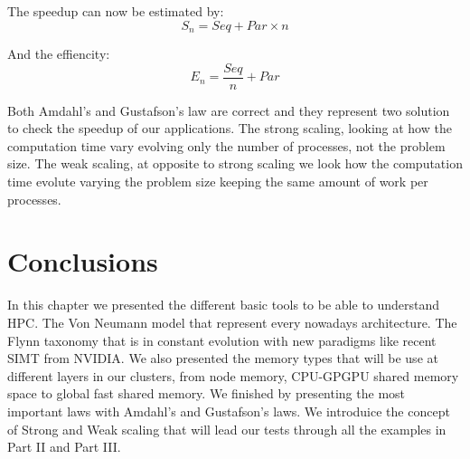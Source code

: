 The speedup can now be estimated by:
\begin{equation}
S_n = Seq + Par \times n
\end{equation}

And the effiencity: 
\begin{equation}
E_n = \frac{Seq}{n} + Par
\end{equation}


Both Amdahl's and Gustafson's law are correct and they represent two solution to check the speedup of our applications. 
The strong scaling, looking at how the computation time vary evolving only the number of processes, not the problem size. 
The weak scaling, at opposite to strong scaling we look how the computation time evolute varying the problem size keeping the same amount of work per processes. 

\section{Conclusions}

In this chapter we presented the different basic tools to be able to understand HPC. 
The Von Neumann model that represent every nowadays architecture. 
The Flynn taxonomy that is in constant evolution with new paradigms like recent SIMT from NVIDIA. 
We also presented the memory types that will be use at different layers in our clusters, from node memory, CPU-GPGPU shared memory space to global fast shared memory. 
We finished by presenting the most important laws with Amdahl's and Gustafson's laws.
We introduice the concept of Strong and Weak scaling that will lead our tests through all the examples in Part II and Part III. 
